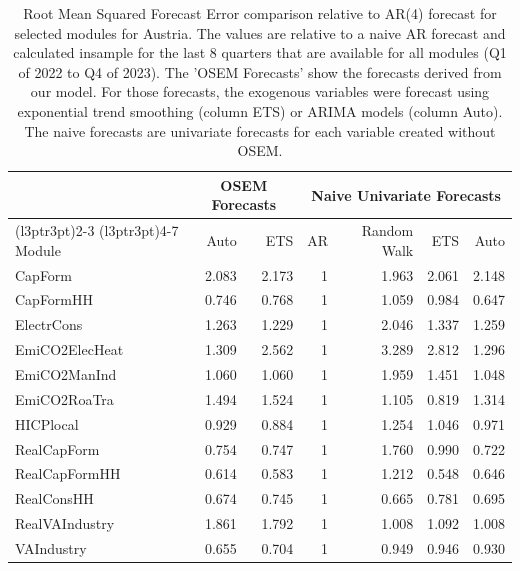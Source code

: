 \begin{table}

\caption{\label{tab:rmsfe_AT}Root Mean Squared Forecast Error comparison relative to AR(4) forecast for selected modules for Austria. The values are relative to a naive AR forecast and calculated insample for the last 8 quarters that are available for all modules (Q1 of 2022 to Q4 of 2023). The 'OSEM Forecasts' show the forecasts derived from our model. For those forecasts, the exogenous variables were forecast using exponential trend smoothing (column ETS) or ARIMA models (column Auto). The naive forecasts are univariate forecasts for each variable created without OSEM.}
\centering
\begin{tabular}[t]{lrrrrrr}
\toprule
\multicolumn{1}{c}{ } & \multicolumn{2}{c}{OSEM Forecasts} & \multicolumn{4}{c}{Naive Univariate Forecasts} \\
\cmidrule(l{3pt}r{3pt}){2-3} \cmidrule(l{3pt}r{3pt}){4-7}
Module & Auto & ETS & AR & Random Walk & ETS & Auto\\
\midrule
CapForm & 2.083 & 2.173 & 1 & 1.963 & 2.061 & 2.148\\
CapFormHH & 0.746 & 0.768 & 1 & 1.059 & 0.984 & 0.647\\
ElectrCons & 1.263 & 1.229 & 1 & 2.046 & 1.337 & 1.259\\
EmiCO2ElecHeat & 1.309 & 2.562 & 1 & 3.289 & 2.812 & 1.296\\
EmiCO2ManInd & 1.060 & 1.060 & 1 & 1.959 & 1.451 & 1.048\\
\addlinespace
EmiCO2RoaTra & 1.494 & 1.524 & 1 & 1.105 & 0.819 & 1.314\\
HICPlocal & 0.929 & 0.884 & 1 & 1.254 & 1.046 & 0.971\\
RealCapForm & 0.754 & 0.747 & 1 & 1.760 & 0.990 & 0.722\\
RealCapFormHH & 0.614 & 0.583 & 1 & 1.212 & 0.548 & 0.646\\
RealConsHH & 0.674 & 0.745 & 1 & 0.665 & 0.781 & 0.695\\
\addlinespace
RealVAIndustry & 1.861 & 1.792 & 1 & 1.008 & 1.092 & 1.008\\
VAIndustry & 0.655 & 0.704 & 1 & 0.949 & 0.946 & 0.930\\
\bottomrule
\end{tabular}
\end{table}
